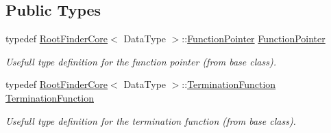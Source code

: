 \subsection*{Public Types}
\begin{DoxyCompactItemize}
\item 
typedef \hyperlink{classtudat_1_1root__finders_1_1RootFinderCore}{Root\+Finder\+Core}$<$ Data\+Type $>$\+::\hyperlink{classtudat_1_1root__finders_1_1HalleyRootFinderCore_a9e10efc0cf93a8e2639cef69cb93212a}{Function\+Pointer} \hyperlink{classtudat_1_1root__finders_1_1HalleyRootFinderCore_a9e10efc0cf93a8e2639cef69cb93212a}{Function\+Pointer}\hypertarget{classtudat_1_1root__finders_1_1HalleyRootFinderCore_a9e10efc0cf93a8e2639cef69cb93212a}{}\label{classtudat_1_1root__finders_1_1HalleyRootFinderCore_a9e10efc0cf93a8e2639cef69cb93212a}

\begin{DoxyCompactList}\small\item\em Usefull type definition for the function pointer (from base class). \end{DoxyCompactList}\item 
typedef \hyperlink{classtudat_1_1root__finders_1_1RootFinderCore}{Root\+Finder\+Core}$<$ Data\+Type $>$\+::\hyperlink{classtudat_1_1root__finders_1_1HalleyRootFinderCore_a7dfa4d30c36f3eef9584a4f108cfc8b9}{Termination\+Function} \hyperlink{classtudat_1_1root__finders_1_1HalleyRootFinderCore_a7dfa4d30c36f3eef9584a4f108cfc8b9}{Termination\+Function}\hypertarget{classtudat_1_1root__finders_1_1HalleyRootFinderCore_a7dfa4d30c36f3eef9584a4f108cfc8b9}{}\label{classtudat_1_1root__finders_1_1HalleyRootFinderCore_a7dfa4d30c36f3eef9584a4f108cfc8b9}

\begin{DoxyCompactList}\small\item\em Usefull type definition for the termination function (from base class). \end{DoxyCompactList}\end{DoxyCompactItemize}
